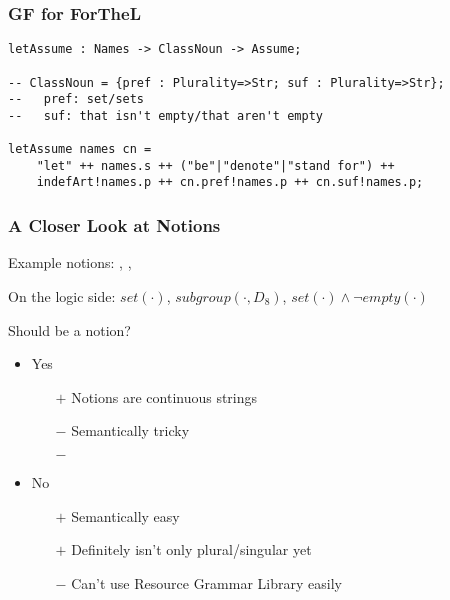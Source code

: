 \begin{frame}[fragile]
    \frametitle{GF for ForTheL}
    {
        \centering
        \par
    }
    \vspace{1em}

    \begin{lstlisting}[language=GF]
letAssume : Names -> ClassNoun -> Assume;

-- ClassNoun = {pref : Plurality=>Str; suf : Plurality=>Str};
--   pref: set/sets
--   suf: that isn't empty/that aren't empty

letAssume names cn =
    "let" ++ names.s ++ ("be"|"denote"|"stand for") ++
    indefArt!names.p ++ cn.pref!names.p ++ cn.suf!names.p;
    \end{lstlisting}
\end{frame}

\begin{frame}[fragile]
    \def\logexpr#1{{\color{logicfg}#1}}
    \frametitle{A Closer Look at Notions}
    Example notions: , , 

    \vspace{0.5em}
    On the logic side: \logexpr{$set(\cdot)$}, \logexpr{$subgroup(\cdot, D_8)$}, \logexpr{$set(\cdot)\wedge\neg empty(\cdot)$}

    \vspace{0.5em}
    Should  be a notion?
    \begin{itemize}
        \item Yes
            \begin{itemize}
                \item[\boldmath$+$] Notions are continuous strings
                \item[\boldmath$-$] Semantically tricky
                \item[\boldmath$-$] 
            \end{itemize}
        \item No
            \begin{itemize}
                \item[\boldmath$+$] Semantically easy
                \item[\boldmath$+$] Definitely isn't only plural/singular yet
                \item[\boldmath$-$] Can't use Resource Grammar Library easily
            \end{itemize}
    \end{itemize}
\end{frame}


